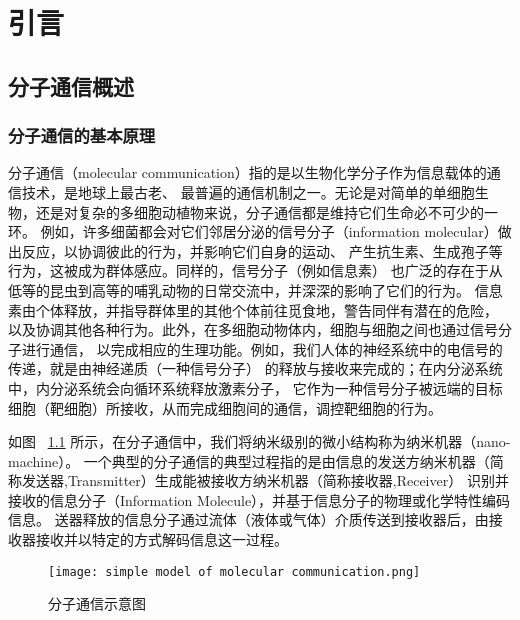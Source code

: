 


\chapter{引言}

\section{分子通信概述}
\subsection{分子通信的基本原理}
分子通信（molecular communication）指的是以生物化学分子作为信息载体的通信技术\cite{Hiyama2010Molecular}，是地球上最古老、
最普遍的通信机制之一。无论是对简单的单细胞生物，还是对复杂的多细胞动植物来说，分子通信都是维持它们生命必不可少的一环。
例如，许多细菌都会对它们邻居分泌的信号分子（information molecular）做出反应，以协调彼此的行为，并影响它们自身的运动、
产生抗生素、生成孢子等行为，这被成为群体感应。同样的，信号分子（例如信息素）
也广泛的存在于从低等的昆虫到高等的哺乳动物的日常交流中，并深深的影响了它们的行为。
信息素由个体释放，并指导群体里的其他个体前往觅食地，警告同伴有潜在的危险，
以及协调其他各种行为。此外，在多细胞动物体内，细胞与细胞之间也通过信号分子进行通信，
以完成相应的生理功能。例如，我们人体的神经系统中的电信号的传递，就是由神经递质（一种信号分子）
的释放与接收来完成的；在内分泌系统中，内分泌系统会向循环系统释放激素分子，
它作为一种信号分子被远端的目标细胞（靶细胞）所接收，从而完成细胞间的通信，调控靶细胞的行为。\cite{Atakan2014Molecular}

如图
~\ref{fig:molecular_communication_example}
所示，在分子通信中，我们将纳米级别的微小结构称为纳米机器（nano-machine）。
一个典型的分子通信的典型过程指的是由信息的发送方纳米机器（简称发送器,Transmitter）生成能被接收方纳米机器（简称接收器,Receiver）
识别并接收的信息分子（Information Molecule），并基于信息分子的物理或化学特性编码信息。
送器释放的信息分子通过流体（液体或气体）介质传送到接收器后，由接收器接收并以特定的方式解码信息这一过程。\cite{基于扩散的分子通信与身体域纳米网络}

\begin{figure}[H]
    \centering
    \texttt{[image: simple model of molecular communication.png]}
    \caption{分子通信示意图\cite{compic}}
    \label{fig:molecular_communication_example}
\end{figure}

